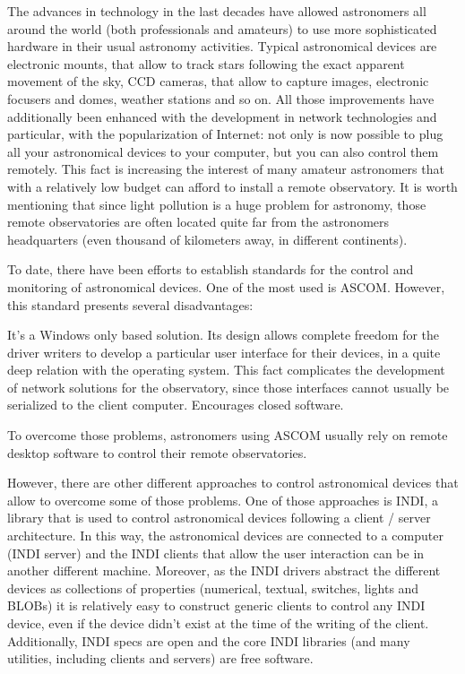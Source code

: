 {{\bigskip
The advances in technology in the last decades have allowed astronomers all around the world (both professionals and amateurs) to use more sophisticated hardware in their usual astronomy activities. Typical astronomical devices are electronic mounts, that allow to track stars following the exact apparent movement of the sky, CCD cameras, that allow to capture images, electronic focusers and domes, weather stations and so on. All those improvements have additionally been enhanced with the development in network technologies and particular, with the popularization of Internet: not only is now possible to plug all your astronomical devices to your computer, but you can also control them remotely. This fact is increasing the interest of many amateur astronomers that with a relatively low budget can afford to install a remote observatory. It is worth mentioning that since light pollution is a huge problem for astronomy, those remote observatories are often located quite far from the astronomers headquarters (even thousand of kilometers away, in different continents).

\bigskip
To date, there have been efforts to establish standards for the control and monitoring of astronomical devices. One of the most used is ASCOM. However, this standard presents several disadvantages:

\bigskip
It's a Windows only based solution.
Its design allows complete freedom for the driver writers to develop a particular user interface for their devices, in a quite deep relation with the operating system. This fact complicates the development of network solutions for the observatory, since those interfaces cannot usually be serialized to the client computer.
Encourages closed software.

\bigskip
To overcome those problems, astronomers using ASCOM usually rely on remote desktop software to  control their remote observatories.

\bigskip
However, there are other different approaches to control astronomical devices that allow to overcome some of those problems. One of those approaches is INDI, a library that is used to control astronomical devices following a client / server architecture. In this way, the astronomical devices are connected to a computer (INDI server) and the INDI clients that allow the user interaction can be in another different machine. Moreover, as the INDI drivers abstract the different devices as collections of properties (numerical, textual, switches, lights and BLOBs) it is relatively easy to construct generic clients to control any INDI device, even if the device didn't exist at the time of the writing of the client. Additionally, INDI specs are open and the core INDI libraries (and many utilities, including clients and servers) are free software.

}}
